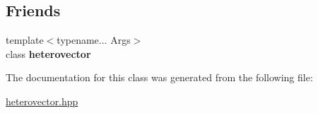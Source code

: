 \subsection*{Friends}
\begin{DoxyCompactItemize}
\item 
\hypertarget{classheterogeneous_1_1heterovector_3_01_t_00_01_types_8_8_8_4_acd0092b47333ef1d1254476c1c3390c4}{}{\footnotesize template$<$typename... Args$>$ }\\class {\bfseries heterovector}\label{classheterogeneous_1_1heterovector_3_01_t_00_01_types_8_8_8_4_acd0092b47333ef1d1254476c1c3390c4}

\end{DoxyCompactItemize}


The documentation for this class was generated from the following file\+:\begin{DoxyCompactItemize}
\item 
\hyperlink{heterovector_8hpp}{heterovector.\+hpp}\end{DoxyCompactItemize}
